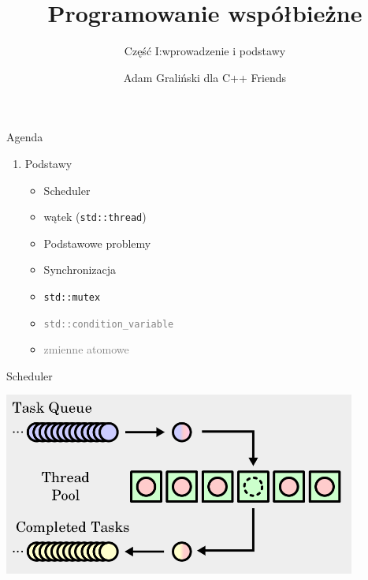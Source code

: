 \documentclass[aspectratio=169]{beamer}
\title{Programowanie współbieżne}
\subtitle{Część I:\@ wprowadzenie i podstawy}
\date[11.2022]{}
\author[gralin.ski]{Adam Graliński dla C++ Friends}
\begin{document}
\begin{frame}
\titlepage{}
\end{frame}

\begin{frame}{Agenda}
\begin{enumerate}
  \item{} Podstawy
  \begin{itemize}
    \item{Scheduler}
    \item{wątek (\texttt{std::thread}) }
    \item{Podstawowe problemy}
    \item{Synchronizacja}
    \item{\texttt{std::mutex}}
    \vskip 1cm%
    \item{} \textcolor{gray}{\texttt{std::condition\_variable}}
    \item{} \textcolor{gray}{zmienne atomowe}
  \end{itemize}
\end{enumerate}
\end{frame}

\begin{frame}[fragile]{Scheduler}
  \begin{center}
    \includegraphics[height=6cm]{img/threadpool.png}
  \end{center}
\end{frame}
\end{document}
